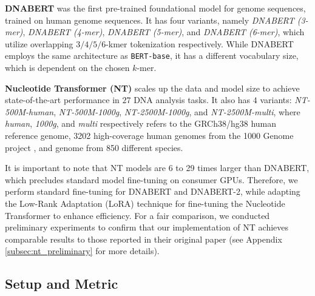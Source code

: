 \documentclass{article}
\begin{document}
\textbf{DNABERT} was the first pre-trained foundational model for genome sequences, trained on human genome sequences. It has four variants, namely \textit{DNABERT (3-mer)}, \textit{DNABERT (4-mer)}, \textit{DNABERT (5-mer)}, and \textit{DNABERT (6-mer)}, which utilize overlapping $3/4/5/6$-kmer tokenization respectively. While DNABERT employs the same architecture as \texttt{BERT-base}, it has a different vocabulary size, which is dependent on the chosen $k$-mer.

\textbf{Nucleotide Transformer (NT)} scales up the data and model size to achieve state-of-the-art performance in $27$ DNA analysis tasks. It also has $4$ variants: \textit{NT-500M-human}, \textit{NT-500M-1000g}, \textit{NT-2500M-1000g}, and \textit{NT-2500M-multi}, where \textit{human}, \textit{1000g}, and \textit{multi} respectively refers to the GRCh38/hg38 human reference genome, 3202 high-coverage human genomes from the 1000 Genome project \citep{1000g}, and genome from 850 different species. 

It is important to note that NT models are 6 to 29 times larger than DNABERT, which precludes standard model fine-tuning on consumer GPUs. Therefore, we perform standard fine-tuning for DNABERT and DNABERT-2, while adapting the Low-Rank Adaptation (LoRA) technique for fine-tuning the Nucleotide Transformer to enhance efficiency. For a fair comparison, we conducted preliminary experiments to confirm that our implementation of NT achieves comparable results to those reported in their original paper \citep{nt} (see Appendix \ref{subsec:nt_preliminary} for more details).

\subsection{Setup and Metric}
\label{subsec:experiments_setup}
\end{document}

